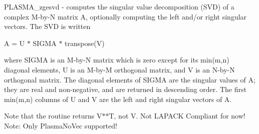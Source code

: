 \label{group__PLASMA__Complex64__t_ga36fc556f67632e00105090a60657dab2_ga36fc556f67632e00105090a60657dab2}
PLASMA\_\-zgesvd -\/ computes the singular value decomposition (SVD) of a complex M-\/by-\/N matrix A, optionally computing the left and/or right singular vectors. The SVD is written

A = U $\ast$ SIGMA $\ast$ transpose(V)

where SIGMA is an M-\/by-\/N matrix which is zero except for its min(m,n) diagonal elements, U is an M-\/by-\/M orthogonal matrix, and V is an N-\/by-\/N orthogonal matrix. The diagonal elements of SIGMA are the singular values of A; they are real and non-\/negative, and are returned in descending order. The first min(m,n) columns of U and V are the left and right singular vectors of A.

Note that the routine returns V$\ast$$\ast$T, not V. Not LAPACK Compliant for now! Note: Only PlasmaNoVec supported!


